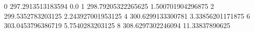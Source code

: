 0 297.2913513183594 0.0
1 298.79205322265625 1.500701904296875
2 299.5352783203125 2.243927001953125
4 300.6299133300781 3.33856201171875
6 303.0453796386719 5.7540283203125
8 308.6297302246094 11.33837890625
